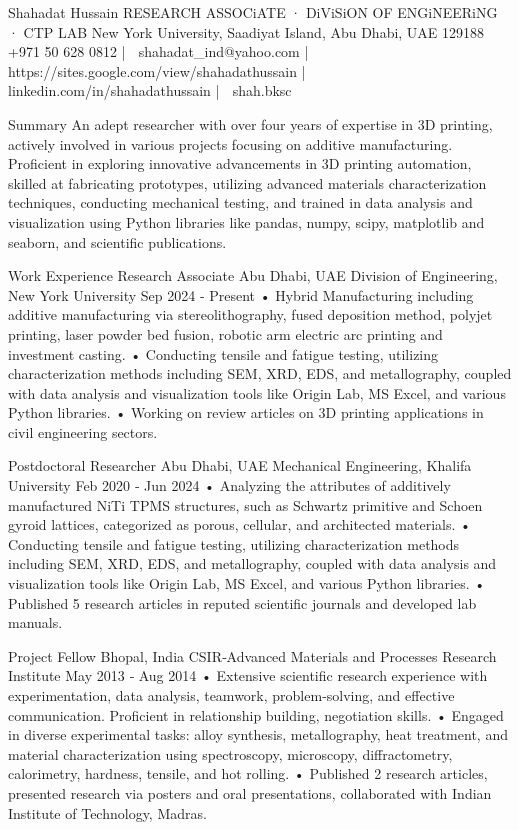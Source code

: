 Shahadat Hussain
RESEARCH ASSOCiATE · DiViSiON OF ENGiNEERiNG · CTP LAB
New York University, Saadiyat Island, Abu Dhabi, UAE 129188
􀄦 +971 50 628 0812 | 􀄇 shahadat_ind@yahoo.com | 􀁵 https://sites.google.com/view/shahadathussain | 􀁝
linkedin.com/in/shahadathussain | 􀁼 shah.bksc

Summary
An adept researcher with over four years of expertise in 3D printing, actively involved in various projects focusing on additive
manufacturing. Proficient in exploring innovative advancements in 3D printing automation, skilled at fabricating
prototypes, utilizing advanced materials characterization techniques, conducting mechanical testing, and trained in
data analysis and visualization using Python libraries like pandas, numpy, scipy, matplotlib and seaborn, and scientific
publications.

Work Experience
Research Associate Abu Dhabi, UAE
Division of Engineering, New York University Sep 2024 ‑ Present
• Hybrid Manufacturing including additive manufacturing via stereolithography, fused deposition method, polyjet
printing, laser powder bed fusion, robotic arm electric arc printing and investment casting.
• Conducting tensile and fatigue testing, utilizing characterization methods including SEM, XRD, EDS, and metallography,
coupled with data analysis and visualization tools like Origin Lab, MS Excel, and various Python libraries.
• Working on review articles on 3D printing applications in civil engineering sectors.

Postdoctoral Researcher Abu Dhabi, UAE
Mechanical Engineering, Khalifa University Feb 2020 ‑ Jun 2024
• Analyzing the attributes of additively manufactured NiTi TPMS structures, such as Schwartz primitive and Schoen
gyroid lattices, categorized as porous, cellular, and architected materials.
• Conducting tensile and fatigue testing, utilizing characterization methods including SEM, XRD, EDS, and metallography,
coupled with data analysis and visualization tools like Origin Lab, MS Excel, and various Python libraries.
• Published 5 research articles in reputed scientific journals and developed lab manuals.

Project Fellow Bhopal, India
CSIR‑Advanced Materials and Processes Research Institute May 2013 ‑ Aug 2014
• Extensive scientific research experience with experimentation, data analysis, teamwork, problem‑solving, and effective
communication. Proficient in relationship building, negotiation skills.
• Engaged in diverse experimental tasks: alloy synthesis, metallography, heat treatment, and material characterization
using spectroscopy, microscopy, diffractometry, calorimetry, hardness, tensile, and hot rolling.
• Published 2 research articles, presented research via posters and oral presentations, collaborated with Indian Institute
of Technology, Madras.

